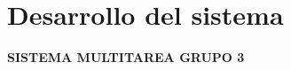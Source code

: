 \documentclass[12pt,a4paper]{article}
\begin{document}
	
	
	\newpage
	
	\section{\textcolor{azulUNEMI}{Desarrollo del sistema}}
	
	\vspace{0.3cm}
	
	
	
	\begin{center}
		{\LARGE\bfseries\textcolor{pseString}{SISTEMA MULTITAREA GRUPO 3}}
	\end{center}
	\vspace{0.5cm}
	\noindent
\end{document}
